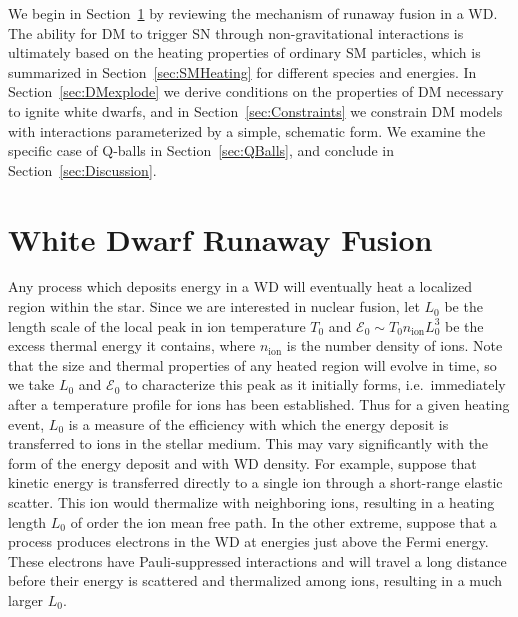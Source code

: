 \documentclass[twocolumn,showpacs,preprintnumbers,amsmath,amssymb,prd]{revtex4}
\newcommand{\Ez}{\mathcal{E}_0}
\begin{document}
We begin in Section~\ref{sec:Review} by reviewing the mechanism of runaway fusion in a WD. 
The ability for DM to trigger SN through non-gravitational interactions is ultimately based on the heating properties of ordinary SM particles, which is summarized in Section~\ref{sec:SMHeating} for different species and energies.
In Section~\ref{sec:DMexplode} we derive conditions on the properties of DM necessary to ignite white dwarfs, and in Section~\ref{sec:Constraints} we constrain DM models with interactions parameterized by a simple, schematic form.  
We examine the specific case of Q-balls in Section~\ref{sec:QBalls}, and conclude in Section~\ref{sec:Discussion}.

\section{White Dwarf Runaway Fusion}
\label{sec:Review}

Any process which deposits energy in a WD will eventually heat a localized region within the star. 
Since we are interested in nuclear fusion, let $L_0$ be the length scale of the local peak in ion temperature $T_0$ and $\Ez \sim T_0 n_\text{ion} L_0^3$ be the excess thermal energy it contains, where $n_\text{ion}$ is the number density of ions. 
Note that the size and thermal properties of any heated region will evolve in time, so we take $L_0$ and $\Ez$ to characterize this peak as it initially forms, i.e.\ immediately after a temperature profile for ions has been established.
Thus for a given heating event, $L_0$ is a measure of the efficiency with which the energy deposit is transferred to ions in the stellar medium.
This may vary significantly with the form of the energy deposit and with WD density.
For example, suppose that kinetic energy is transferred directly to a single ion through a short-range elastic scatter.
This ion would thermalize with neighboring ions, resulting in a heating length $L_0$ of order the ion mean free path.
In the other extreme, suppose that a process produces electrons in the WD at energies just above the Fermi energy.
These electrons have Pauli-suppressed interactions and will travel a long distance before their energy is scattered and thermalized among ions, resulting in a much larger $L_0$.
\end{document}
